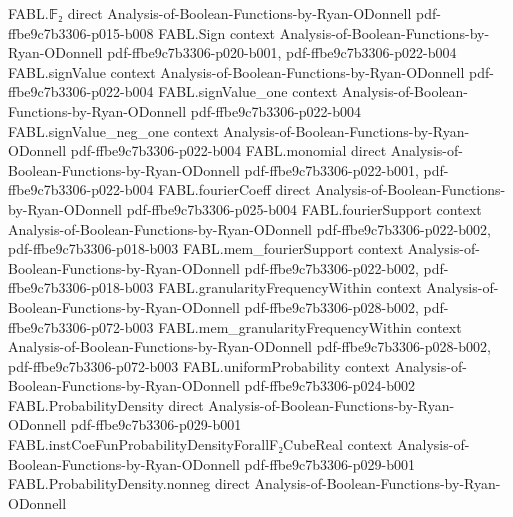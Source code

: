 \begin{theorem}
\label{FABL.ProbabilityDensity.toPMF_convolution}
\leanok
{}
\proofstep
  {FABL.𝔽₂}
  {direct}
  {Analysis-of-Boolean-Functions-by-Ryan-ODonnell}
  {pdf-ffbe9c7b3306-p015-b008}
\proofstep
  {FABL.Sign}
  {context}
  {Analysis-of-Boolean-Functions-by-Ryan-ODonnell}
  {pdf-ffbe9c7b3306-p020-b001,
    pdf-ffbe9c7b3306-p022-b004}
\proofstep
  {FABL.signValue}
  {context}
  {Analysis-of-Boolean-Functions-by-Ryan-ODonnell}
  {pdf-ffbe9c7b3306-p022-b004}
\proofstep
  {FABL.signValue_one}
  {context}
  {Analysis-of-Boolean-Functions-by-Ryan-ODonnell}
  {pdf-ffbe9c7b3306-p022-b004}
\proofstep
  {FABL.signValue_neg_one}
  {context}
  {Analysis-of-Boolean-Functions-by-Ryan-ODonnell}
  {pdf-ffbe9c7b3306-p022-b004}
\proofstep
  {FABL.monomial}
  {direct}
  {Analysis-of-Boolean-Functions-by-Ryan-ODonnell}
  {pdf-ffbe9c7b3306-p022-b001,
    pdf-ffbe9c7b3306-p022-b004}
\proofstep
  {FABL.fourierCoeff}
  {direct}
  {Analysis-of-Boolean-Functions-by-Ryan-ODonnell}
  {pdf-ffbe9c7b3306-p025-b004}
\proofstep
  {FABL.fourierSupport}
  {context}
  {Analysis-of-Boolean-Functions-by-Ryan-ODonnell}
  {pdf-ffbe9c7b3306-p022-b002,
    pdf-ffbe9c7b3306-p018-b003}
\proofstep
  {FABL.mem_fourierSupport}
  {context}
  {Analysis-of-Boolean-Functions-by-Ryan-ODonnell}
  {pdf-ffbe9c7b3306-p022-b002,
    pdf-ffbe9c7b3306-p018-b003}
\proofstep
  {FABL.granularityFrequencyWithin}
  {context}
  {Analysis-of-Boolean-Functions-by-Ryan-ODonnell}
  {pdf-ffbe9c7b3306-p028-b002,
    pdf-ffbe9c7b3306-p072-b003}
\proofstep
  {FABL.mem_granularityFrequencyWithin}
  {context}
  {Analysis-of-Boolean-Functions-by-Ryan-ODonnell}
  {pdf-ffbe9c7b3306-p028-b002,
    pdf-ffbe9c7b3306-p072-b003}
\proofstep
  {FABL.uniformProbability}
  {context}
  {Analysis-of-Boolean-Functions-by-Ryan-ODonnell}
  {pdf-ffbe9c7b3306-p024-b002}
\proofstep
  {FABL.ProbabilityDensity}
  {direct}
  {Analysis-of-Boolean-Functions-by-Ryan-ODonnell}
  {pdf-ffbe9c7b3306-p029-b001}
\proofstep
  {FABL.instCoeFunProbabilityDensityForallF₂CubeReal}
  {context}
  {Analysis-of-Boolean-Functions-by-Ryan-ODonnell}
  {pdf-ffbe9c7b3306-p029-b001}
\proofstep
  {FABL.ProbabilityDensity.nonneg}
  {direct}
  {Analysis-of-Boolean-Functions-by-Ryan-ODonnell}

\end{theorem}
